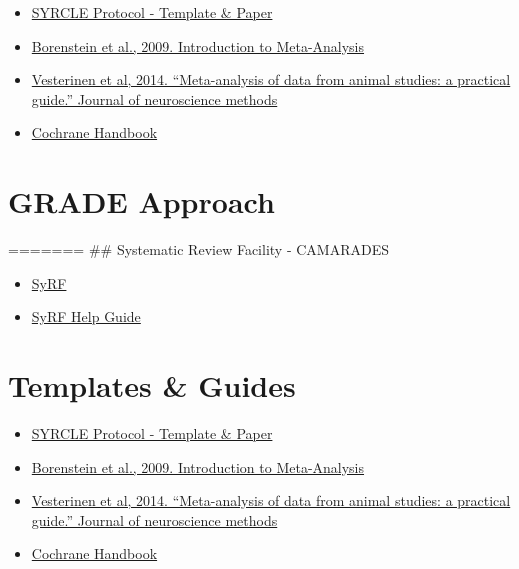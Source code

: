 \documentclass[
]{book}
\providecommand{\tightlist}{%
  \setlength{\itemsep}{0pt}\setlength{\parskip}{0pt}}
\begin{document}
\begin{itemize}
\tightlist
\item
  \href{https://onlinelibrary.wiley.com/doi/epdf/10.1002/ebm2.7}{SYRCLE Protocol - Template \& Paper}
\item
  \href{https://onlinelibrary.wiley.com/doi/book/10.1002/9780470743386}{Borenstein et al., 2009. Introduction to Meta-Analysis}
\item
  \href{https://doi.org/10.1016/j.jneumeth.2013.09.010}{Vesterinen et al, 2014. ``Meta-analysis of data from animal studies: a practical guide.'' Journal of neuroscience methods}
\item
  \href{https://training.cochrane.org/handbook/current}{Cochrane Handbook}
\end{itemize}

\hypertarget{grade-approach}{%
\section{GRADE Approach}\label{grade-approach}}

=======
\#\# Systematic Review Facility - CAMARADES

\begin{itemize}
\tightlist
\item
  \href{http://syrf.org.uk/}{SyRF}
\item
  \href{https://assets.syrf.org.uk/guides/SyRF_User_Guide.pdf}{SyRF Help Guide}
\end{itemize}

\hypertarget{templates-guides-1}{%
\section{Templates \& Guides}\label{templates-guides-1}}

\begin{itemize}
\tightlist
\item
  \href{https://onlinelibrary.wiley.com/doi/epdf/10.1002/ebm2.7}{SYRCLE Protocol - Template \& Paper}
\item
  \href{https://onlinelibrary.wiley.com/doi/book/10.1002/9780470743386}{Borenstein et al., 2009. Introduction to Meta-Analysis}
\item
  \href{https://doi.org/10.1016/j.jneumeth.2013.09.010}{Vesterinen et al, 2014. ``Meta-analysis of data from animal studies: a practical guide.'' Journal of neuroscience methods}
\item
  \href{https://training.cochrane.org/handbook/current}{Cochrane Handbook}
\end{itemize}
\end{document}

